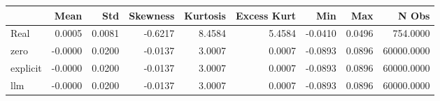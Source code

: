 \begin{tabular}{lrrrrrrrr}
\toprule
 & Mean & Std & Skewness & Kurtosis & Excess Kurt & Min & Max & N Obs \\
\midrule
Real & 0.0005 & 0.0081 & -0.6217 & 8.4584 & 5.4584 & -0.0410 & 0.0496 & 754.0000 \\
zero & -0.0000 & 0.0200 & -0.0137 & 3.0007 & 0.0007 & -0.0893 & 0.0896 & 60000.0000 \\
explicit & -0.0000 & 0.0200 & -0.0137 & 3.0007 & 0.0007 & -0.0893 & 0.0896 & 60000.0000 \\
llm & -0.0000 & 0.0200 & -0.0137 & 3.0007 & 0.0007 & -0.0893 & 0.0896 & 60000.0000 \\
\bottomrule
\end{tabular}
